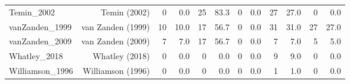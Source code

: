 \begin{table}[ht]
\begin{tabular}{lrrrrrrrrrrr}
Temin\_2002 & Temin (2002) & 0 & 0.0 & 25 & 83.3 & 0 & 0.0 & 27 & 27.0 & 0 & 0.0 \\
vanZanden\_1999 & van Zanden (1999) & 10 & 10.0 & 17 & 56.7 & 0 & 0.0 & 31 & 31.0 & 27 & 27.0 \\
vanZanden\_2009 & van Zanden (2009) & 7 & 7.0 & 17 & 56.7 & 0 & 0.0 & 7 & 7.0 & 5 & 5.0 \\
Whatley\_2018 & Whatley (2018) & 0 & 0.0 & 0 & 0.0 & 0 & 0.0 & 9 & 9.0 & 0 & 0.0 \\
Williamson\_1996 & Williamson (1996) & 0 & 0.0 & 0 & 0.0 & 0 & 0.0 & 1 & 1.0 & 0 & 0.0 \\
\bottomrule
\end{tabular}
\end{table}
